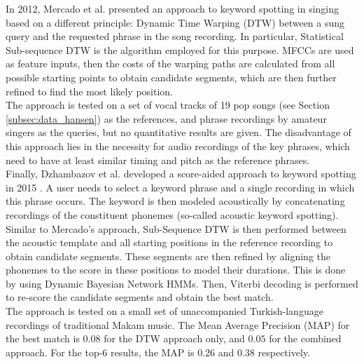 In 2012, Mercado et al. presented an approach to keyword spotting in singing based on a different principle: Dynamic Time Warping (DTW) between a sung query and the requested phrase in the song recording. In particular, Statistical Sub-sequence DTW is the algorithm employed for this purpose. MFCCs are used as feature inputs, then the costs of the warping paths are calculated from all possible starting points to obtain candidate segments, which are then further refined to find the most likely position.\\
The approach is tested on a set of vocal tracks of 19 pop songs (see Section \ref{subsec:data_hansen}) as the references, and phrase recordings by amateur singers as the queries, but no quantitative results are given. The disadvantage of this approach lies in the necessity for audio recordings of the key phrases, which need to have at least similar timing and pitch as the reference phrases.\\

Finally, Dzhambazov et al. developed a score-aided approach to keyword spotting in 2015 \cite{dzhambazov_ismir}. A user needs to select a keyword phrase and a single recording in which this phrase occurs. The keyword is then modeled acoustically by concatenating recordings of the constituent phonemes (so-called acoustic keyword spotting). Similar to Mercado's approach, Sub-Sequence DTW is then performed between the acoustic template and all starting positions in the reference recording to obtain candidate segments. These segments are then refined by aligning the phonemes to the score in these positions to model their durations. This is done by using Dynamic Bayesian Network HMMs. Then, Viterbi decoding is performed to re-score the candidate segments and obtain the best match.\\
The approach is tested on a small set of unaccompanied Turkish-language recordings of traditional Makam music. The Mean Average Precision (MAP) for the best match is $0.08$ for the DTW approach only, and $0.05$ for the combined approach. For the top-6 results, the MAP is $0.26$ and $0.38$ respectively.


